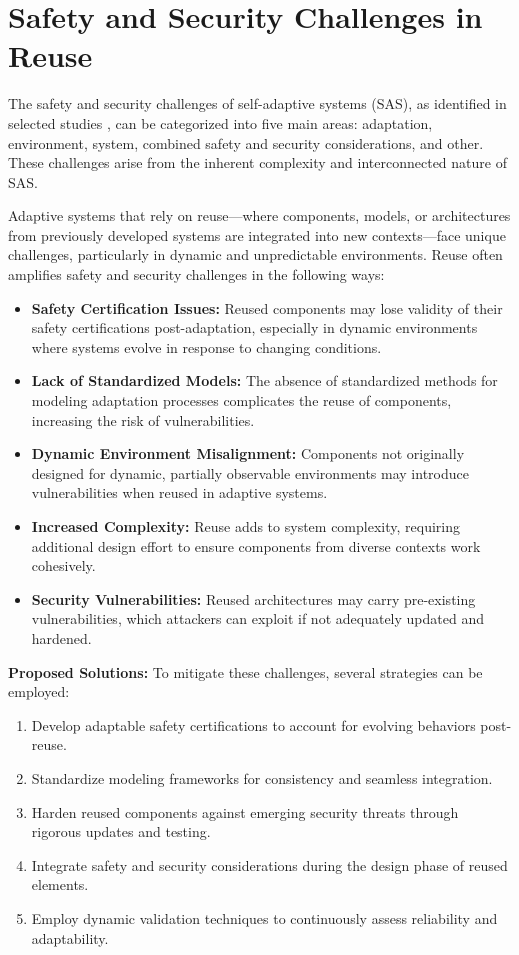\documentclass[a4paper,10pt]{article}
\begin{document}



\section{Safety and Security Challenges in Reuse}

The safety and security challenges of self-adaptive systems (SAS), as identified in selected studies \cite{Pekaric2023}, can be categorized into five main areas: adaptation, environment, system, combined safety and security considerations, and other. These challenges arise from the inherent complexity and interconnected nature of SAS.

Adaptive systems that rely on reuse—where components, models, or architectures from previously developed systems are integrated into new contexts—face unique challenges, particularly in dynamic and unpredictable environments. Reuse often amplifies safety and security challenges in the following ways:

\begin{itemize}
    \item \textbf{Safety Certification Issues:} Reused components may lose validity of their safety certifications post-adaptation, especially in dynamic environments where systems evolve in response to changing conditions.
    \item \textbf{Lack of Standardized Models:} The absence of standardized methods for modeling adaptation processes complicates the reuse of components, increasing the risk of vulnerabilities.
    \item \textbf{Dynamic Environment Misalignment:} Components not originally designed for dynamic, partially observable environments may introduce vulnerabilities when reused in adaptive systems.
    \item \textbf{Increased Complexity:} Reuse adds to system complexity, requiring additional design effort to ensure components from diverse contexts work cohesively.
    \item \textbf{Security Vulnerabilities:} Reused architectures may carry pre-existing vulnerabilities, which attackers can exploit if not adequately updated and hardened.
\end{itemize}

\textbf{Proposed Solutions:}
To mitigate these challenges, several strategies can be employed:
\begin{enumerate}
    \item Develop adaptable safety certifications to account for evolving behaviors post-reuse.
    \item Standardize modeling frameworks for consistency and seamless integration.
    \item Harden reused components against emerging security threats through rigorous updates and testing.
    \item Integrate safety and security considerations during the design phase of reused elements.
    \item Employ dynamic validation techniques to continuously assess reliability and adaptability.
\end{enumerate}
\end{document}
